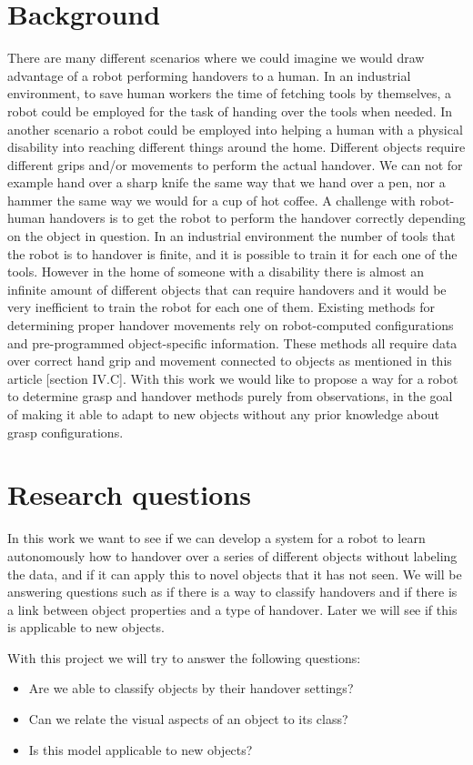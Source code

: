\section{Background}

There are many different scenarios where we could imagine we would draw advantage of a robot performing handovers to a human. In an industrial environment, to save human workers the time of fetching tools by themselves, a robot could be employed for the task of handing over the tools when needed. In another scenario a robot could be employed into helping a human with a physical disability into reaching different things around the home. Different objects require different grips and/or movements to perform the actual handover. We can not for example hand over a sharp knife the same way that we hand over a pen, nor a hammer the same way we would for a cup of hot coffee. A challenge with robot-human handovers is to get the robot to perform the handover correctly depending on the object in question. In an industrial environment the number of tools that the robot is to handover is finite, and it is possible to train it for each one of the tools. However in the home of someone with a disability there is almost an infinite amount of different objects that can require handovers and it would be very inefficient to train the robot for each one of them. Existing methods for determining proper handover movements rely on robot-computed configurations and pre-programmed object-specific information. These methods all require data over correct hand grip and movement connected to objects as mentioned in this article [section IV.C]. With this work we would like to propose a way for a robot to determine grasp and handover methods purely from observations, in the goal of making it able to adapt to new objects without any prior knowledge about grasp configurations.

\section{Research questions}
\label{sec:research_questions}

In this work we want to see if we can develop a system for a robot to learn autonomously how to handover over a series of different objects without labeling the data, and if it can apply this to novel objects that it has not seen. We will be answering questions such as if there is a way to classify handovers and if there is a link between object properties and a type of handover. Later we will see if this is applicable to new objects.

With this project we will try to answer the following questions:
\begin{itemize}
	\item Are we able to classify objects by their handover settings?
	\item Can we relate the visual aspects of an object to its class?
	\item Is this model applicable to new objects?
\end{itemize}
